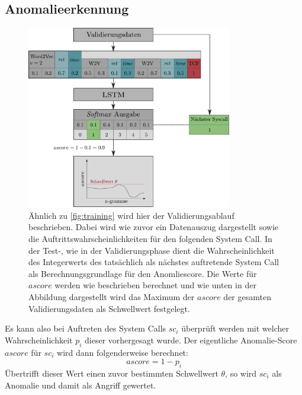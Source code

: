         \subsection{Anomalieerkennung}\label{sec:Anomalieerkennung}
            \begin{figure}[ht]
                \centering
                \includegraphics[width=0.8\textwidth]{images/Validation_overview.pdf}
                \caption{Ähnlich zu \autoref{fig:training} wird hier der Validierungsablauf beschrieben.
                         Dabei wird wie zuvor ein Datenauszug dargestellt sowie die Auftrittswahrscheinlichkeiten für den folgenden System Call.
                         In der Test-, wie in der Validierungsphase dient die Wahrscheinlichkeit des Integerwerts des tatsächlich als nächstes auftretende System Call als Berechnungsgrundlage für den Anomliescore. Die Werte für $ascore$ werden wie beschrieben berechnet und wie unten in der Abbildung dargestellt wird das Maximum der $ascore$ der gesamten Validierungsdaten als Schwellwert festgelegt.}
                \label{fig:validierung}
            \end{figure}
            Es kann also bei Auftreten des System Calls $sc_i$ überprüft werden mit welcher Wahrscheinlichkeit $p_i$ dieser vorhergesagt wurde.
            Der eigentliche Anomalie-Score $ascore$ für $sc_i$ wird dann folgenderweise berechnet:
            \begin{equation}
                ascore = 1 - p_i
            \end{equation}
            Übertrifft dieser Wert einen zuvor bestimmten Schwellwert $\theta$, so wird $sc_i$ als Anomalie und damit als Angriff gewertet.

